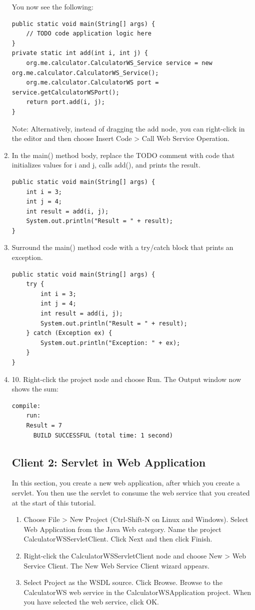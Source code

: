 \begin{enumerate}
You now see the following:
\begin{lstlisting}
public static void main(String[] args) {
    // TODO code application logic here
}
private static int add(int i, int j) {
    org.me.calculator.CalculatorWS_Service service = new org.me.calculator.CalculatorWS_Service();
    org.me.calculator.CalculatorWS port = service.getCalculatorWSPort();
    return port.add(i, j);
}
\end{lstlisting}
Note: Alternatively, instead of dragging the add node, you can right-click in the editor and then choose Insert Code > Call Web Service Operation. 

\item In the main() method body, replace the TODO comment with code that initializes values for i and j, calls add(), and prints the result.
\begin{lstlisting}
public static void main(String[] args) {
    int i = 3;
    int j = 4;
    int result = add(i, j);
    System.out.println("Result = " + result);
}
\end{lstlisting}

\item Surround the main() method code with a try/catch block that prints an exception. 
\begin{lstlisting}
public static void main(String[] args) {
    try {
        int i = 3;
        int j = 4;
        int result = add(i, j);
        System.out.println("Result = " + result);
    } catch (Exception ex) {
        System.out.println("Exception: " + ex);
    }
}
\end{lstlisting}

\item 10.	Right-click the project node and choose Run.
The Output window now shows the sum:
\begin{lstlisting}
compile:
    run:
    Result = 7
      BUILD SUCCESSFUL (total time: 1 second)
\end{lstlisting}

\subsection{Client 2: Servlet in Web Application}
In this section, you create a new web application, after which you create a servlet. You then use the servlet to consume the web service that you created at the start of this tutorial.
\begin{enumerate}
\item Choose File > New Project (Ctrl-Shift-N on Linux and Windows). Select Web Application from the Java Web category. Name the project CalculatorWSServletClient. Click Next and then click Finish.
\item Right-click the CalculatorWSServletClient node and choose New > Web Service Client.
The New Web Service Client wizard appears.
\item Select Project as the WSDL source. Click Browse. Browse to the CalculatorWS web service in the CalculatorWSApplication project. When you have selected the web service, click OK.


\end{enumerate}
\end{enumerate}
